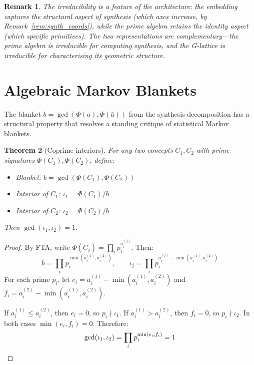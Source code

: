 \documentclass[11pt,a4paper]{article}
\newtheorem{theorem}{Theorem}
\newtheorem{remark}[theorem]{Remark}
\begin{document}
\begin{remark}
The irreducibility is a feature of the architecture: the
embedding captures the \emph{structural} aspect of synthesis
(which axes increase, by Remark~\ref{rem:synth_coords}), while
the prime algebra retains the \emph{identity} aspect (which
specific primitives). The two representations are
complementary---the prime algebra is irreducible for computing
synthesis, and the G-lattice is irreducible for characterising
its geometric structure.
\end{remark}

\section{Algebraic Markov Blankets}
\label{sec:blankets}

The blanket $b=\gcd(\Phi(a),\Phi(\bar{a}))$ from the synthesis
decomposition has a structural property that resolves a standing
critique of statistical Markov blankets.

\begin{theorem}[Coprime interiors]
\label{thm:mb}
For any two concepts $C_1,C_2$ with prime signatures
$\Phi(C_1),\Phi(C_2)$, define:
\begin{itemize}[nosep]
\item Blanket: $b = \gcd(\Phi(C_1),\Phi(C_2))$
\item Interior of $C_1$: $\iota_1 = \Phi(C_1)/b$
\item Interior of $C_2$: $\iota_2 = \Phi(C_2)/b$
\end{itemize}
Then $\gcd(\iota_1,\iota_2) = 1$.
\end{theorem}

\begin{proof}
By FTA, write $\Phi(C_j) = \prod_i p_i^{a_i^{(j)}}$. Then:
\begin{equation}
b = \prod_i p_i^{\min(a_i^{(1)}, a_i^{(2)})}, \qquad
\iota_j = \prod_i p_i^{a_i^{(j)} - \min(a_i^{(1)}, a_i^{(2)})}
\end{equation}
For each prime $p_i$, let
$e_i = a_i^{(1)} - \min(a_i^{(1)}, a_i^{(2)})$ and
$f_i = a_i^{(2)} - \min(a_i^{(1)}, a_i^{(2)})$.

If $a_i^{(1)} \leq a_i^{(2)}$, then $e_i=0$, so $p_i\nmid\iota_1$.
If $a_i^{(1)} > a_i^{(2)}$, then $f_i=0$, so $p_i\nmid\iota_2$.
In both cases $\min(e_i,f_i)=0$. Therefore:
\[
\gcd(\iota_1,\iota_2) = \prod_i p_i^{\min(e_i,f_i)} = 1 \qedhere
\]
\end{proof}
\end{document}
